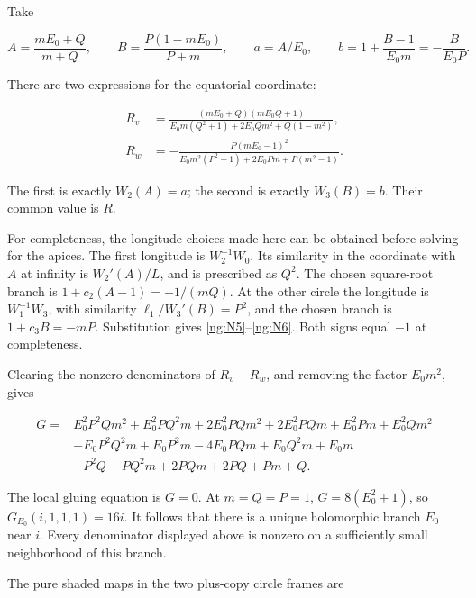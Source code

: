 Take

\begin{equation}\label{ng:N5}
A=\frac{mE_0+Q}{m+Q},\qquad B=\frac{P(1-mE_0)}{P+m},\qquad
 a=A/E_0,\qquad b=1+\frac{B-1}{E_0m}=-\frac{B}{E_0P}.
\end{equation}

There are two expressions for the equatorial coordinate:

\begin{equation}\label{ng:N6}
\begin{aligned}
 R_v&=\frac{(mE_0+Q)(mE_0Q+1)}
 {E_0m(Q^2+1)+2E_0Qm^2+Q(1-m^2)},\\
 R_w&=-\frac{P(mE_0-1)^2}
 {E_0m^2(P^2+1)+2E_0Pm+P(m^2-1)}.
\end{aligned}
\end{equation}

The first is exactly \(W_2(A)=a\); the second is exactly
\(W_3(B)=b\). Their common value is \(R\).

For completeness, the longitude choices made here can be obtained
before solving for the apices. The first longitude is
\(W_2^{-1}W_0\). Its similarity in the coordinate with \(A\)
at infinity is \(W_2'(A)/L\), and is prescribed as \(Q^2\).
The chosen square-root branch is
\(1+c_2(A-1)=-1/(mQ)\). At the other circle the longitude is
\(W_1^{-1}W_3\), with similarity
\(\ell_1/W_3'(B)=P^2\), and the chosen branch is
\(1+c_3B=-mP\). Substitution gives \eqref{ng:N5}--\eqref{ng:N6}.
Both signs equal \(-1\) at completeness.

Clearing the nonzero denominators of \(R_v-R_w\), and removing
the factor \(E_0m^2\), gives

\begin{equation}\label{ng:N7}
\begin{aligned}
G={}&E_0^2P^2Qm^2+E_0^2PQ^2m+2E_0^2PQm^2+2E_0^2PQm
       +E_0^2Pm+E_0^2Qm^2\\
 &+E_0P^2Q^2m+E_0P^2m-4E_0PQm+E_0Q^2m+E_0m\\
 &+P^2Q+PQ^2m+2PQm+2PQ+Pm+Q.
\end{aligned}
\end{equation}

The local gluing equation is \(G=0\). At \(m=Q=P=1\),
\(G=8(E_0^2+1)\), so \(G_{E_0}(i,1,1,1)=16i\).
It follows that there is a unique holomorphic branch \(E_0\) near
\(i\). Every denominator displayed above is nonzero on a sufficiently
small neighborhood of this branch.

The pure shaded maps in the two plus-copy circle frames are

